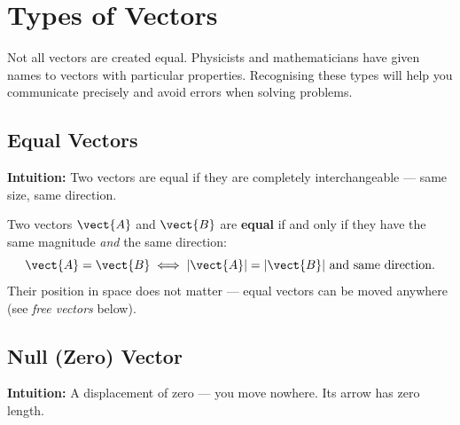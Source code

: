 \section{Types of Vectors}
\label{sec:types_of_vectors}

Not all vectors are created equal. Physicists and
mathematicians have given names to vectors with
particular properties. Recognising these types will
help you communicate precisely and avoid errors when
solving problems.

\subsection*{Equal Vectors}

\textbf{Intuition:} Two vectors are equal if they are
completely interchangeable --- same size, same direction.

\begin{definitionbox}
Two vectors $\vect{A}$ and $\vect{B}$ are \textbf{equal}
if and only if they have the same magnitude \textit{and}
the same direction:
\[
  \vect{A} = \vect{B}
  \iff |\vect{A}| = |\vect{B}|
  \text{ and same direction.}
\]
Their position in space does not matter --- equal vectors
can be moved anywhere (see \textit{free vectors} below).
\end{definitionbox}

\begin{diagbox}
\begin{center}
\end{center}
\end{diagbox}

\subsection*{Null (Zero) Vector}

\textbf{Intuition:} A displacement of zero --- you move
nowhere. Its arrow has zero length.

